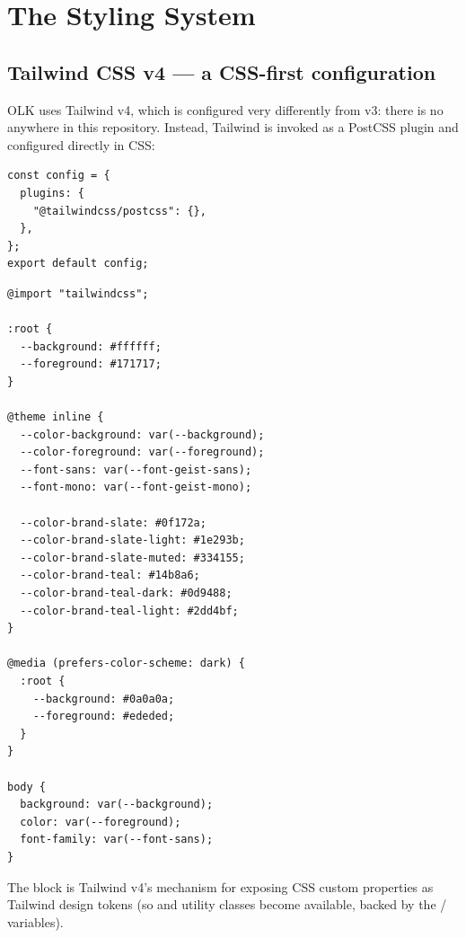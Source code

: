 \chapter{The Styling System}
\label{ch:styling}

\section{Tailwind CSS v4 — a CSS-first configuration}

OLK uses Tailwind v4, which is configured very differently from v3: there is no  anywhere in this repository. Instead, Tailwind is invoked as a PostCSS plugin and configured directly in CSS:

\begin{lstlisting}[caption={postcss.config.mjs — the entire build wiring}]
const config = {
  plugins: {
    "@tailwindcss/postcss": {},
  },
};
export default config;
\end{lstlisting}

\begin{lstlisting}[caption={src/app/globals.css — in full}]
@import "tailwindcss";

:root {
  --background: #ffffff;
  --foreground: #171717;
}

@theme inline {
  --color-background: var(--background);
  --color-foreground: var(--foreground);
  --font-sans: var(--font-geist-sans);
  --font-mono: var(--font-geist-mono);

  --color-brand-slate: #0f172a;
  --color-brand-slate-light: #1e293b;
  --color-brand-slate-muted: #334155;
  --color-brand-teal: #14b8a6;
  --color-brand-teal-dark: #0d9488;
  --color-brand-teal-light: #2dd4bf;
}

@media (prefers-color-scheme: dark) {
  :root {
    --background: #0a0a0a;
    --foreground: #ededed;
  }
}

body {
  background: var(--background);
  color: var(--foreground);
  font-family: var(--font-sans);
}
\end{lstlisting}

The  block is Tailwind v4's mechanism for exposing CSS custom properties as Tailwind design tokens (so  and  utility classes become available, backed by the / variables).

